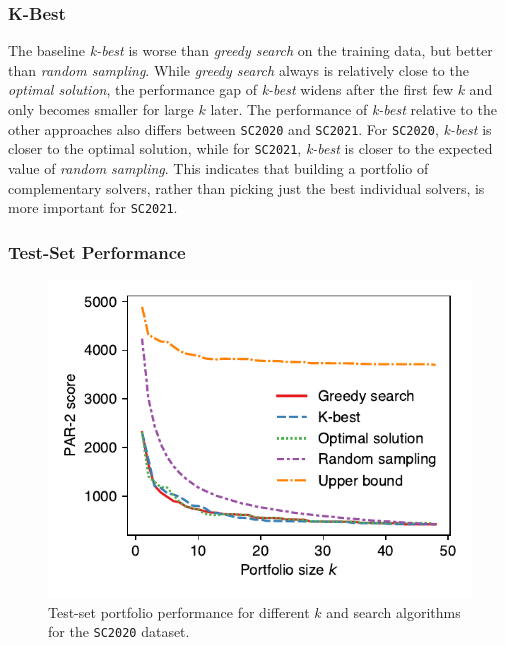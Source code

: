 \documentclass[conference]{IEEEtran}
\begin{document}
\subsubsection{K-Best}

The baseline \emph{k-best} is worse than \emph{greedy search} on the training data, but better than \emph{random sampling}.
While \emph{greedy search} always is relatively close to the \emph{optimal solution}, the performance gap of \emph{k-best} widens after the first few $k$ and only becomes smaller for large $k$ later.
The performance of \emph{k-best} relative to the other approaches also differs between \texttt{SC2020} and \texttt{SC2021}.
For \texttt{SC2020}, \emph{k-best} is closer to the optimal solution, while for \texttt{SC2021}, \emph{k-best} is closer to the expected value of \emph{random sampling}.
This indicates that building a portfolio of complementary solvers, rather than picking just the best individual solvers, is more important for \texttt{SC2021}.

\subsubsection{Test-Set Performance}

\begin{figure}[t]
	\centering
	\includegraphics[width=0.98\columnwidth]{plots/search-test-objective-2020.pdf}
	\caption{
		Test-set portfolio performance for different $k$ and search algorithms for the \texttt{SC2020} dataset.
	}
	\label{fig:search-test-objective-2020}
\end{figure}
\end{document}
